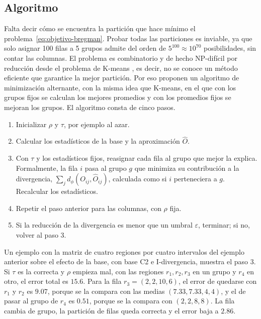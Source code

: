 \subsection{Algoritmo}\label{sec:bbac-algoritmo}

Falta decir cómo se encuentra la partición que hace mínimo el
problema~\eqref{eq:objetivo-bregman}. Probar todas las particiones es inviable, ya que solo
asignar 100 filas a 5 grupos admite del orden de $5^{100} \approx 10^{70}$
posibilidades, sin contar las columnas. El problema es combinatorio y de hecho
NP-difícil por reducción desde el problema de K-means \citep{Banerjee2007}, es
decir, no se conoce un método eficiente que garantice la mejor partición. Por eso
\citet{Banerjee2007} proponen un algoritmo de minimización alternante, con la misma
idea que K-means, en el que con los grupos fijos se calculan los mejores promedios y con los
promedios fijos se mejoran los grupos. El algoritmo consta de cinco pasos.

\begin{enumerate}
  \item Inicializar $\rho$ y $\tau$, por ejemplo al azar.
  \item Calcular los estadísticos de la base y la aproximación $\hat{O}$.
  \item Con $\tau$ y los estadísticos fijos, reasignar cada fila al grupo que
        mejor la explica. Formalmente, la fila $i$ pasa al grupo $g$ que minimiza
        su contribución a la divergencia, $\sum_j d_\phi(O_{ij}, \hat{O}_{ij})$,
        calculada como si $i$ perteneciera a $g$. Recalcular los estadísticos.
  \item Repetir el paso anterior para las columnas, con $\rho$ fija.
  \item Si la reducción de la divergencia es menor que un umbral $\varepsilon$,
        terminar; si no, volver al paso 3.
\end{enumerate}

Un ejemplo con la matriz de cuatro regiones por cuatro intervalos del ejemplo
anterior sobre el efecto de la base, con base C2 e I-divergencia, muestra el paso 3. Si $\tau$ es
la correcta y $\rho$ empieza mal, con las regiones $r_1, r_2, r_3$ en un grupo y
$r_4$ en otro, el error total es $15.6$. Para la fila $r_3 = (2, 2, 10, 6)$, el
error de quedarse con $r_1$ y $r_2$ es $9.07$, porque se la compara con las medias
$(7.33, 7.33, 4, 4)$, y el de pasar al grupo de $r_4$ es $0.51$, porque se la
compara con $(2, 2, 8, 8)$. La fila cambia de grupo, la partición de filas queda
correcta y el error baja a $2.86$.

